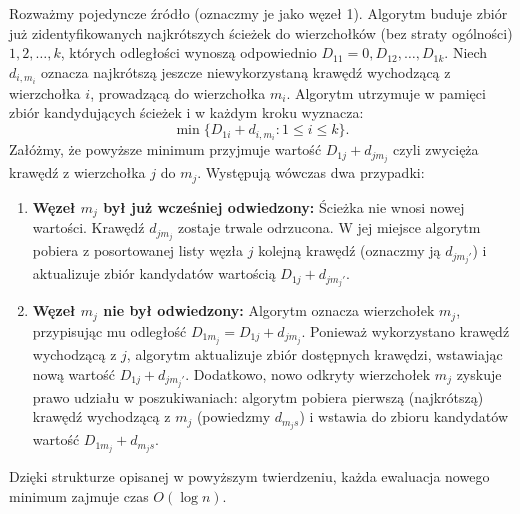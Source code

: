 Rozważmy pojedyncze źródło (oznaczmy je jako węzeł 1). Algorytm buduje zbiór już zidentyfikowanych najkrótszych ścieżek do wierzchołków (bez straty ogólności) $1, 2, \ldots, k$, których odległości wynoszą odpowiednio $D_{11}=0, D_{12}, \ldots, D_{1k}$. Niech $d_{i,m_i}$ oznacza najkrótszą jeszcze niewykorzystaną krawędź wychodzącą z wierzchołka $i$, prowadzącą do wierzchołka $m_i$. Algorytm utrzymuje w pamięci zbiór kandydujących ścieżek i w każdym kroku wyznacza:
\[
\min\{D_{1i} + d_{i,m_i} : 1 \leq i \leq k\}.
\]
Załóżmy, że powyższe minimum przyjmuje wartość $D_{1j} + d_{jm_j}$ czyli zwycięża krawędź z wierzchołka $j$ do $m_j$. Występują wówczas dwa przypadki:
\begin{enumerate}
  \item \textbf{Węzeł $m_j$ był już wcześniej odwiedzony:} Ścieżka nie wnosi nowej wartości. Krawędź $d_{jm_j}$ zostaje trwale odrzucona. W jej miejsce algorytm pobiera z posortowanej listy węzła $j$ kolejną krawędź (oznaczmy ją $d_{jm_j'}$) i aktualizuje zbiór kandydatów wartością $D_{1j} + d_{jm_j'}$.
  \item \textbf{Węzeł $m_j$ nie był odwiedzony:} Algorytm oznacza wierzchołek $m_j$, przypisując mu odległość $D_{1m_j} = D_{1j} + d_{jm_j}$. Ponieważ wykorzystano krawędź wychodzącą z $j$, algorytm aktualizuje zbiór dostępnych krawędzi, wstawiając nową wartość $D_{1j} + d_{jm_j'}$. Dodatkowo, nowo odkryty wierzchołek $m_j$ zyskuje prawo udziału w poszukiwaniach: algorytm pobiera pierwszą (najkrótszą) krawędź wychodzącą z $m_j$ (powiedzmy $d_{m_j s}$) i wstawia do zbioru kandydatów wartość $D_{1m_j} + d_{m_j s}$.
\end{enumerate}
Dzięki strukturze opisanej w powyższym twierdzeniu, każda ewaluacja nowego minimum zajmuje czas $O(\log n)$.

